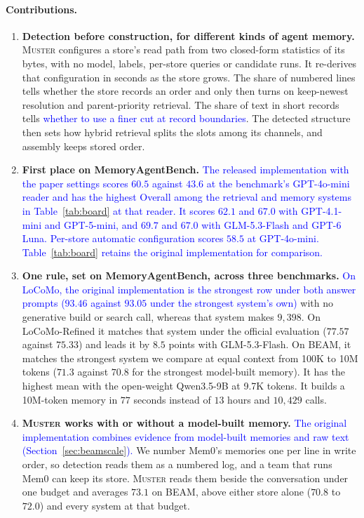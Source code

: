 \documentclass{article}
\newcommand{\nativechange}[1]{\textcolor{blue}{#1}}
\newcommand{\sys}{\textsc{Muster}}
\begin{document}
\paragraph{Contributions.}
\begin{enumerate}[label=(\roman*),leftmargin=*,nosep]
\item \textbf{Detection before construction, for different kinds of agent memory.}
\sys{} configures a store's read path from two closed-form statistics of its bytes, with no model, labels, per-store queries or candidate runs. It re-derives that configuration in seconds as the store grows. The share of numbered lines tells whether the store records an order and only then turns on keep-newest resolution and parent-priority retrieval. The share of text in short records tells \nativechange{whether to use a finer cut at record boundaries}. The detected structure then sets how hybrid retrieval splits the slots among its channels, and assembly keeps stored order.
\item \textbf{First place on MemoryAgentBench.}
\nativechange{The released implementation with the paper settings scores $60.5$ against $43.6$ at the benchmark's GPT-4o-mini reader and has the highest Overall among the retrieval and memory systems in Table~\ref{tab:board} at that reader. It scores $62.1$ and $67.0$ with GPT-4.1-mini and GPT-5-mini, and $69.7$ and $67.0$ with GLM-5.3-Flash and GPT-6 Luna. Per-store automatic configuration scores $58.5$ at GPT-4o-mini. Table~\ref{tab:board} retains the original implementation for comparison.}
\item \textbf{One rule, set on MemoryAgentBench, across three benchmarks.}
\nativechange{On LoCoMo, the original implementation is the strongest row under both answer prompts ($93.46$ against $93.05$ under the strongest system's own)} with no generative build or search call, whereas that system makes $9{,}398$. On LoCoMo-Refined it matches that system under the official evaluation ($77.57$ against $75.33$) and leads it by $8.5$ points with GLM-5.3-Flash. On BEAM, it matches the strongest system we compare at equal context from 100K to 10M tokens ($71.3$ against $70.8$ for the strongest model-built memory). It has the highest mean with the open-weight Qwen3.5-9B at 9.7K tokens. It builds a 10M-token memory in $77$ seconds instead of $13$ hours and $10{,}429$ calls.
\item \textbf{\sys{} works with or without a model-built memory.}
\nativechange{The original implementation combines evidence from model-built memories and raw text (Section~\ref{sec:beamscale}).} We number Mem0's memories one per line in write order, so detection reads them as a numbered log, and a team that runs Mem0 can keep its store. \sys{} reads them beside the conversation under one budget and averages $73.1$ on BEAM, above either store alone ($70.8$ to $72.0$) and every system at that budget.
\end{enumerate}
\end{document}
